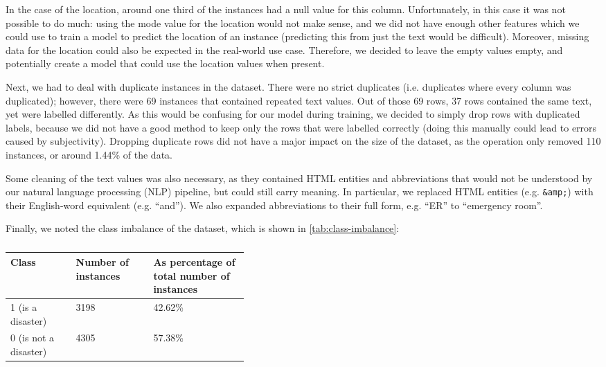In the case of the location, around one third of the instances had a null value for this column.
Unfortunately, in this case it was not possible to do much: using the mode value for the location would not make sense, and we did not have enough other features which we could use to train a model to predict the location of an instance (predicting this from just the text would be difficult). Moreover, missing data for the location could also be expected in the real-world use case. Therefore, we decided to leave the empty values empty, and potentially create a model that could use the location values when present.

Next, we had to deal with duplicate instances in the dataset.
There were no strict duplicates (i.e. duplicates where every column was duplicated); however, there were 69 instances that contained repeated text values. Out of those 69 rows, 37 rows contained the same text, yet were labelled differently. As this would be confusing for our model during training, we decided to simply drop rows with duplicated labels, because we did not have a good method to keep only the rows that were labelled correctly (doing this manually could lead to errors caused by subjectivity). Dropping duplicate rows did not have a major impact on the size of the dataset, as the operation only removed 110 instances, or around 1.44\% of the data.

Some cleaning of the text values was also necessary, as they contained HTML entities and abbreviations that would not be understood by our natural language processing (NLP) pipeline, but could still carry meaning.
In particular, we replaced HTML entities (e.g. \verb|&amp;|) with their English-word equivalent (e.g. ``and''). We also expanded abbreviations to their full form, e.g. ``ER'' to ``emergency room''.

Finally, we noted the class imbalance of the dataset, which is shown in \autoref{tab:class-imbalance}:

\begin{table}[h!]
  \centering
  \vspace{1em}
  \renewcommand{\arraystretch}{1.5}
  \begin{tabular}{| l | l | p{0.4\linewidth} |}
    \hline
    \textbf{Class} & \textbf{Number of instances} & \textbf{As percentage of total number of instances} \\ \hline
    1 (is a disaster) & 3198 & 42.62\% \\ \hline
    0 (is not a disaster) & 4305 & 57.38\% \\ \hline
  \end{tabular}
  \renewcommand{\arraystretch}{1}
  \vspace{1em}
  \caption{}
  \label{tab:class-imbalance}
\end{table}

